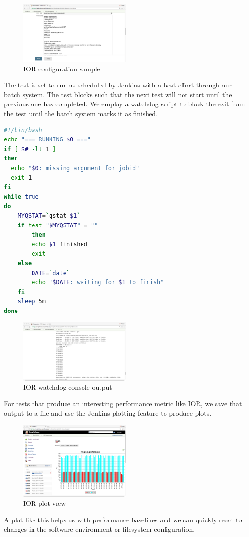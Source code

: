 \documentclass[10pt, conference, compsocconf]{IEEEtran}
\begin{document}
\begin{figure}[H]
\centering
\includegraphics[width=0.5\textwidth]{IOR-configuration-sample}
\caption{ IOR configuration sample }
\label{fig:IOR-configuration-sample}
\end{figure}

The test is set to run as scheduled by Jenkins with a best-effort through our batch system.  The test blocks such that the next test will not start until the previous one has completed.  We employ a watchdog script to block the exit from the test until the batch system marks it as finished.

\begin{lstlisting}[float,frame=tb,captionpos=t,language=bash,caption={pbs/torque watchdog script}, label=lst:watchdog]
#!/bin/bash
echo "=== RUNNING $0 ==="
if [ $# -lt 1 ]
then
  echo "$0: missing argument for jobid"
  exit 1
fi
while true
do
	MYQSTAT=`qstat $1`
	if test "$MYQSTAT" = ""
        then
		echo $1 finished
		exit
	else
		DATE=`date`
		echo "$DATE: waiting for $1 to finish"
	fi
	sleep 5m
done
\end{lstlisting}

\begin{figure}[H]
\centering
\includegraphics[width=0.5\textwidth]{IOR-watchdog-out}
\caption{ IOR watchdog console output }
\label{fig:IOR-watchdog-out}
\end{figure}
For tests that produce an interesting performance metric like IOR, we save that output to a file and use the Jenkins plotting feature to produce plots. 
\begin{figure}[H]
\centering
\includegraphics[width=0.5\textwidth]{IOR-plot}
\caption{ IOR plot view }
\label{fig:IOR-plot}
\end{figure}
A plot like this helps us with performance baselines and we can quickly react to changes in the software environment or filesystem configuration.
\end{document}

